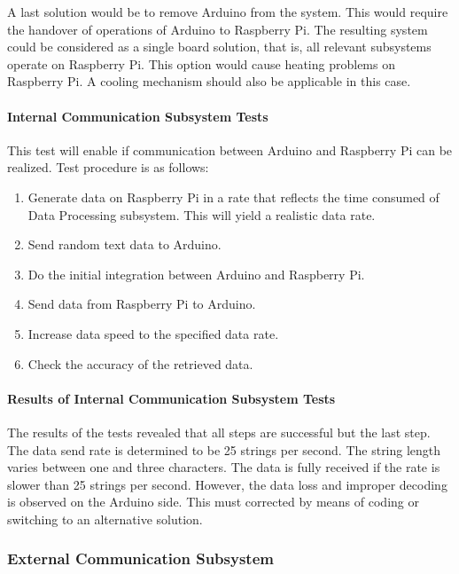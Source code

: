 \documentclass[a4paper,12pt]{article}
\begin{document}
		A last solution would be to remove Arduino from the system. This would require the handover of operations of Arduino to Raspberry Pi. The resulting system could be considered as a single board solution, that is, all relevant subsystems operate on Raspberry Pi. This option would cause heating problems on Raspberry Pi. A cooling mechanism should also be applicable in this case.
	\paragraph{Internal Communication Subsystem Tests}
	This test will enable if communication between Arduino and Raspberry Pi can be realized. Test procedure is as follows:
	\begin{enumerate}
		\item Generate data on Raspberry Pi in a rate that reflects the time consumed of Data Processing subsystem. This will yield a realistic data rate. \vspace{-0.2cm}
		\item Send random text data to Arduino. \vspace{-0.2cm}
		\item Do the initial integration between Arduino and Raspberry Pi. \vspace{-0.2cm}
		\item Send data from Raspberry Pi to Arduino. \vspace{-0.2cm}
		\item Increase data speed to the specified data rate. \vspace{-0.2cm}
		\item Check the accuracy of the retrieved data.\vspace{-0.2cm}
	\end{enumerate}
	
	\paragraph{Results of Internal Communication Subsystem Tests}
	The results of the tests revealed that all steps are successful but the last step. The data send rate is determined to be 25 strings per second. The string length varies between one and three characters. The data is fully received if the rate is slower than 25 strings per second. However, the data loss  and  improper decoding is observed on the Arduino side. This must corrected by means of coding or switching to an alternative solution.
	
	\subsubsection{External Communication Subsystem}
	
\end{document}
